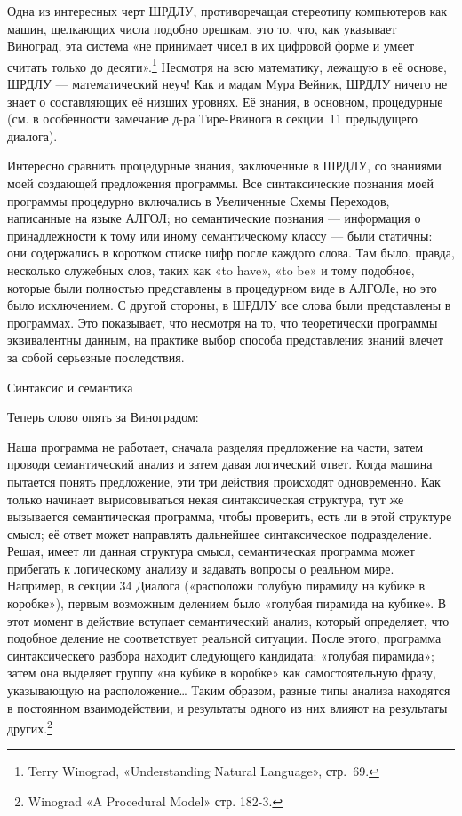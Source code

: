 \documentclass[../main.tex]{subfiles}
\begin{document}
Одна из интересных черт ШРДЛУ, противоречащая стереотипу компьютеров как машин, щелкающих числа подобно орешкам, это то, что, как указывает Виноград, эта система «не принимает чисел в их цифровой форме и умеет считать только до десяти».\footnote{Terry Winograd, «Understanding Natural Language», стр.~69.} Несмотря на всю математику, лежащую в её основе, ШРДЛУ --- математический неуч! Как и мадам Мура Вейник, ШРДЛУ ничего не знает о составляющих её низших уровнях. Её знания, в основном, процедурные (см. в особенности замечание д-ра Тире-Рвинога в секции~11 предыдущего диалога).

Интересно сравнить процедурные знания, заключенные в ШРДЛУ, со знаниями моей создающей предложения программы. Все синтаксические познания моей программы процедурно включались в Увеличенные Схемы Переходов, написанные на языке АЛГОЛ; но семантические познания --- информация о принадлежности к тому или иному семантическому классу --- были статичны: они содержались в коротком списке цифр после каждого слова. Там было, правда, несколько служебных слов, таких как «to have», «to be» и тому подобное, которые были полностью представлены в процедурном виде в АЛГОЛе, но это было исключением. С другой стороны, в ШРДЛУ все слова были представлены в программах. Это показывает, что несмотря на то, что теоретически программы эквивалентны данным, на практике выбор способа представления знаний влечет за собой серьезные последствия.

Синтаксис и семантика

Теперь слово опять за Виноградом:

Наша программа не работает, сначала разделяя предложение на части, затем проводя семантический анализ и затем давая логический ответ. Когда машина пытается понять предложение, эти три действия происходят одновременно. Как только начинает вырисовываться некая синтаксическая структура, тут же вызывается семантическая программа, чтобы проверить, есть ли в этой структуре смысл; её ответ может направлять дальнейшее синтаксическое подразделение. Решая, имеет ли данная структура смысл, семантическая программа может прибегать к логическому анализу и задавать вопросы о реальном мире. Например, в секции 34 Диалога («расположи голубую пирамиду на кубике в коробке»), первым возможным делением было «голубая пирамида на кубике». В этот момент в действие вступает семантический анализ, который определяет, что подобное деление не соответствует реальной ситуации. После этого, программа синтаксическего разбора находит следующего кандидата: «голубая пирамида»; затем она выделяет группу «на кубике в коробке» как самостоятельную фразу, указывающую на расположение\ldots{} Таким образом, разные типы анализа находятся в постоянном взаимодействии, и результаты одного из них влияют на результаты других.\footnote{Winograd «A Procedural Model» стр. 182-3.}
\end{document}

